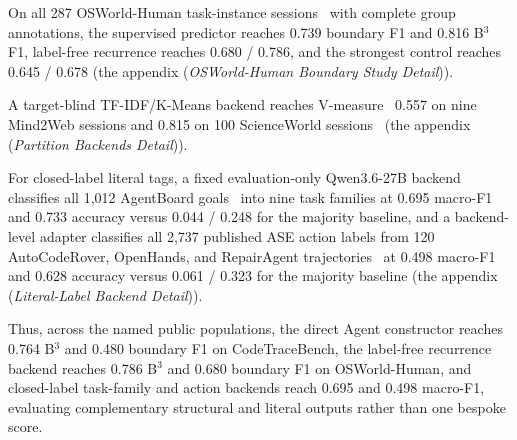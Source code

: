 \documentclass[letterpaper]{article}
\begin{document}
On all 287 OSWorld-Human task-instance sessions~\cite{osworldhuman} with
complete group annotations, the supervised predictor reaches 0.739 boundary
F1 and 0.816 B$^3$ F1, label-free recurrence reaches 0.680 / 0.786, and the
strongest control reaches 0.645 / 0.678 (the appendix (\emph{OSWorld-Human Boundary Study Detail})).

A target-blind TF-IDF/K-Means backend reaches V-measure~\cite{rosenberg-hirschberg-2007-v-measure} 0.557 on nine Mind2Web sessions and 0.815 on 100 ScienceWorld sessions~\cite{mind2web,scienceworld} (the appendix (\emph{Partition Backends Detail})).

For closed-label literal tags, a fixed evaluation-only Qwen3.6-27B
backend~\cite{qwen36} classifies all 1{,}012 AgentBoard
goals~\cite{agentboard} into nine task families at 0.695 macro-F1 and 0.733
accuracy versus 0.044 / 0.248 for the majority baseline, and a backend-level
adapter classifies all 2{,}737 published ASE action labels from 120 AutoCodeRover,
OpenHands, and RepairAgent trajectories~\cite{traceview-2026,
bouzenia-pradel-2025-trajectories} at 0.498 macro-F1 and 0.628 accuracy versus
0.061 / 0.323 for the majority baseline (the appendix (\emph{Literal-Label Backend Detail})).

Thus, across the named public populations, the direct Agent constructor
reaches 0.764 B$^3$ and 0.480 boundary F1 on CodeTraceBench, the label-free
recurrence backend reaches 0.786 B$^3$ and 0.680 boundary F1 on OSWorld-Human,
and closed-label task-family and action backends reach 0.695 and 0.498
macro-F1, evaluating complementary structural and literal outputs rather than
one bespoke score.
\end{document}
